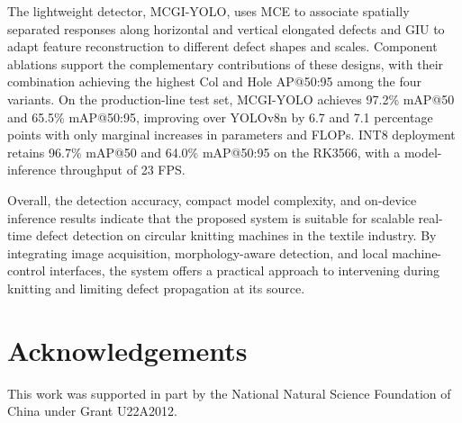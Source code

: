 \documentclass[a4paper,fleqn]{cas-dc}
\newcommand{\model}{MCGI-YOLO\xspace}
\begin{document}
The lightweight detector, \model, uses MCE to associate spatially separated responses along horizontal and vertical elongated defects and GIU to adapt feature reconstruction to different defect shapes and scales. Component ablations support the complementary contributions of these designs, with their combination achieving the highest Col and Hole AP@50:95 among the four variants. On the production-line test set, \model achieves 97.2\% mAP@50 and 65.5\% mAP@50:95, improving over YOLOv8n by 6.7 and 7.1 percentage points with only marginal increases in parameters and FLOPs. INT8 deployment retains 96.7\% mAP@50 and 64.0\% mAP@50:95 on the RK3566, with a model-inference throughput of 23 FPS.

Overall, the detection accuracy, compact model complexity, and on-device inference results indicate that the proposed system is suitable for scalable real-time defect detection on circular knitting machines in the textile industry. By integrating image acquisition, morphology-aware detection, and local machine-control interfaces, the system offers a practical approach to intervening during knitting and limiting defect propagation at its source.

\FloatBarrier

\section*{Acknowledgements}
This work was supported in part by the National Natural Science Foundation of China under Grant U22A2012.


\begingroup
{}
\renewcommand{\bibfont}{\fontsize{8}{9.3}\selectfont}

\endgroup
\end{document}
